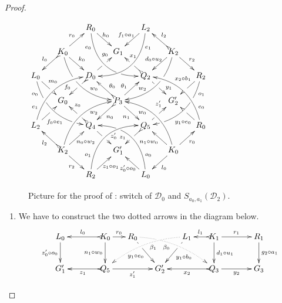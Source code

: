 \documentclass[a4paper,UKenglish,cleveref,pdftex,thm-restate,numberwithinsect,anonymous]{lipics}
\def\G{\textbf {\textup{G}}}
\newcommand{\dder}[1]{\mathscr{#1}}
\begin{document}
\begin{proof}
	
	\begin{figure}
		\centering
		$\xymatrix@C=15pt@R=15pt{&&R_0 \ar@/_.8cm/[ddrr]_(.2){e_0}|(.7)\hole
			\ar[dr]^{\hspace{-5pt}h_0}&& L_2\ar@/^.8cm/[ddll]^(.2){e_1}
			\ar[dl]_{f_1\circ a_1\hspace{-5pt}}\\&K_0\ar[dr]^{k_0}\ar@{>->}[dl]_{l_0}
			\ar@/_.6cm/[ddrr]|(.36)\hole^(.65){w_0}\ar[ur]^{r_0}&& G_1 &&
			K_2 \ar@/^.6cm/[ddll]|(.36)\hole_(.65){w_2}\ar[dl]_{d_0\circ
				u_2\hspace{-5pt}}\ar@{>->}[lu]_{l_2} \ar[dr]^{r_2}\\L_0
			\ar@/_.6cm/[ddrr]_(.2){o_0}|(.31)\hole|(.81)\hole
			\ar[dr]^(.4){m_0}|(.61)\hole && D_0
			\ar@{>->}[dl]|(.4)\hole_(.65){f_0}\ar[ur]|(.5)\hole^(.7){g_0}&&Q_2
			\ar[dr]|(.4)\hole^(.65){y_1}
			\ar@{>->}[ul]|(.5)\hole_(.65){x_1}&&R_2\ar@/^.6cm/[ddll]^(.2){o_1}|(.31)\hole|(.81)\hole\ar[dl]_(.3){x_2\circ
				b_1}|(.58)\hole \\&G_0 &&P_3\ar[dr]_{n_1}
			\ar@{>->}[dl]^{n_0}\ar[ur]^(.4){\theta_1}\ar@{>->}[ul]_(.4){\theta_0}&&G'_2\\L_2
			\ar@/^.6cm/[uurr]^(.2){e_1} \ar[ur]_(.35){f_0\circ
				e_1}|(.61)\hole&&Q_4
			\ar@{>->}[ul]|(.4)\hole_(.65){z_0}\ar[dr]|(.5)\hole^(.65){z'_0}
			&&Q_5\ar[ur]|(.4)\hole^(.65){z'_1}
			\ar@{>->}[dl]|(.5)\hole_(.65){z_1} && R_0 \ar[ul]^(.3){y_1\circ
				e_0}|(.6)\hole\ar@/_.6cm/[uull]_(.2){e_0}\\&K_2
			\ar[ur]_{\hspace{-2pt}n_0\circ w_2} \ar[dr]_{r_2}
			\ar@{>->}[ul]^{l_2}\ar@/^.6cm/[uurr]_(.65){w_2}&&G'_1&& K_0
			\ar[ur]_{r_0} \ar[ul]^{n_1\circ w_0} \ar[dl]^{l_0}
			\ar@/_.6cm/[uull]^(.65){w_0}\\&& R_2
			\ar[ur]_{\hspace{-4pt}z_1\circ
				o_1}\ar@/^.8cm/[uurr]^(.2){o_1}&& L_0 \ar[ul]^{z'_0\circ
				o_0\hspace{-7pt}} \ar@/_.8cm/[uull]_(.2){o_0} |(.69)\hole
		}	$
		\caption{Picture for the proof of : switch of $\dder{D}_0$ and $S_{a_0,a_1}(\dder{D}_2)$.}
		\label{fi:third}
	\end{figure}
	
	\begin{enumerate}
		\item We have to construct the two dotted arrows in the diagram
		below.
		\[\xymatrix@C=15pt{L_0 \ar[d]_{z'_0\circ o_0}&& K_0
			\ar[d]_{n_1\circ w_0}\ar@{>->}[ll]_{l_0} \ar[r]^{r_0} & R_0
			\ar@{.>}@/^.35cm/[drrr]_(.4){\beta_0}|(.285)\hole
			\ar[dr]|(.28)\hole_{y_1\circ e_0} && L_1
			\ar@{.>}@/_.35cm/[dlll]^(.4){\beta_1}
			\ar[dl]|(.28)\hole^{y_1\circ b_0}& K_1 \ar[d]^{d_1\circ
				u_1}\ar@{>->}[l]_{l_1} \ar[rr]^{r_1} && R_1 \ar[d]^{g_2\circ
				a_1}\\G'_1 && \ar@{>->}[ll]^{z_1} Q_5 \ar[rr]_{z'_1}&& G'_2 &&
			\ar@{>->}[ll]^{x_2} Q_3 \ar[rr]_{y_2}&& G_3}\]
		

\end{enumerate}
\end{proof}
\end{document}
